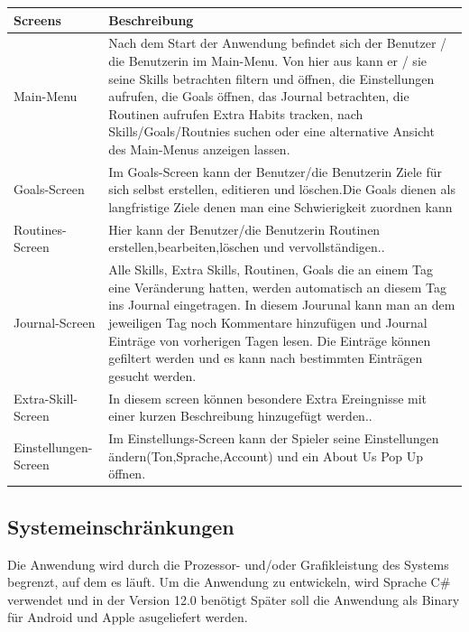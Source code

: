 \documentclass{article}
\begin{document}
\begin{tabularx}{\textwidth}{|l|X|}
        \hline
        \textbf{Screens} & \textbf{Beschreibung} \\
        \hline
        Main-Menu & Nach dem Start der Anwendung befindet sich der Benutzer / die Benutzerin im Main-Menu. Von hier aus kann er / sie seine Skills betrachten filtern und öffnen, die Einstellungen aufrufen, die Goals öffnen, das Journal betrachten, die Routinen aufrufen  Extra Habits tracken, nach Skills/Goals/Routnies suchen oder eine alternative Ansicht des Main-Menus anzeigen lassen.\\
        \hline
        Goals-Screen & Im Goals-Screen kann der Benutzer/die Benutzerin Ziele für sich selbst erstellen, editieren und löschen.Die Goals dienen als langfristige Ziele denen man eine Schwierigkeit zuordnen kann\\
        \hline
        Routines-Screen & Hier kann der Benutzer/die Benutzerin Routinen erstellen,bearbeiten,löschen und vervollständigen.. \\
        \hline
         Journal-Screen & Alle Skills, Extra Skills, Routinen, Goals die an einem Tag eine Veränderung hatten, werden automatisch an diesem Tag ins Journal eingetragen. In diesem Jourunal kann man an dem jeweiligen Tag noch Kommentare hinzufügen und Journal Einträge von vorherigen Tagen lesen. Die Einträge können gefiltert werden und es kann nach bestimmten Einträgen gesucht werden. \\
        \hline
         Extra-Skill-Screen & In diesem screen können besondere Extra Ereingnisse mit einer kurzen Beschreibung hinzugefügt werden.. \\
        \hline
         Einstellungen-Screen & Im Einstellungs-Screen kann der Spieler seine Einstellungen ändern(Ton,Sprache,Account) und ein About Us Pop Up öffnen. \\
   
      
        
    \end{tabularx}

\subsection{Systemeinschränkungen}

Die Anwendung wird durch die Prozessor- und/oder Grafikleistung des Systems begrenzt, auf dem es läuft. 
    Um die Anwendung zu entwickeln, wird Sprache C\# verwendet und in der Version 12.0 benötigt 
    Später soll die Anwendung als Binary für Android und Apple asugeliefert werden.
\end{document}
